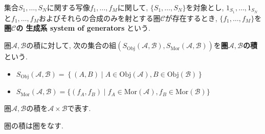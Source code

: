 \begin{comment}
\begin{proof}
\end{proof}
\end{comment}
\begin{Def}
集合$S_1,\dots,S_N$に関する写像$f_1,\dots,f_M$に関して,
$\{S_1,\dots,S_N\}$を対象とし,
$1_{S_1},\dots,1_{S_N}$と$f_1,\dots,f_M$およびそれらの合成のみを射とする圏$\mathscr{C}$が存在するとき, $\{f_1,\dots,f_M\}$を
{\bf 圏$\mathscr{C}$の
生成系 system of generators
}という.
\end{Def}
\begin{Def}
圏$\mathscr{A},\mathscr{B}$の積に対して, 次の集合の組$(S_{\mathrm{Obj}}\left(\mathscr{A},\mathscr{B}\right),S_{\mathrm{Mor}}\left(\mathscr{A},\mathscr{B}\right))$を{\bf 圏$\mathscr{A},\mathscr{B}$の積}という.
\begin{itemize}
\item $S_{\mathrm{Obj}}\left(\mathscr{A},\mathscr{B}\right)
=\left\{(A,B)\mid A\in\mathrm{Obj}(\mathscr{A}),B\in\mathrm{Obj}(\mathscr{B})\right\}$
\item $S_{\mathrm{Mor}}\left(\mathscr{A},\mathscr{B}\right)
=\{(f_A,f_B)\mid f_A\in\mathrm{Mor(\mathscr{A})},
f_B\in\mathrm{Mor(\mathscr{B})}\}$
\end{itemize}
\end{Def}
\begin{Def}
圏$\mathscr{A},\mathscr{B}$の積を$\mathscr{A}\times\mathscr{B}$で表す.
\end{Def}
\begin{Prop}
圏の積は圏をなす.
\end{Prop}
\begin{comment}
\begin{proof}
\end{proof}
\end{comment}
